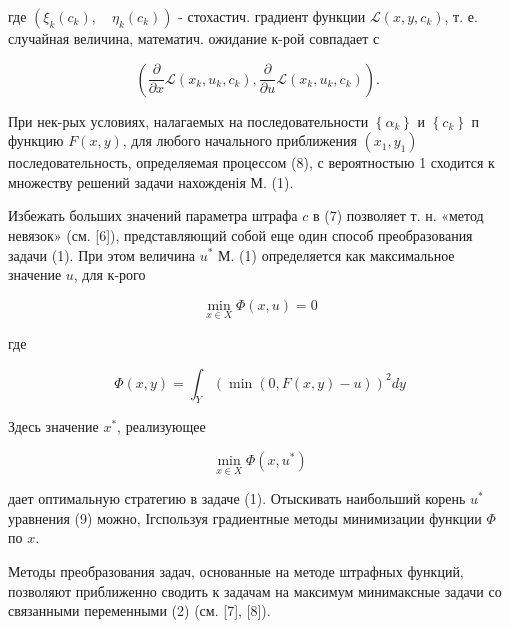 \documentclass[10pt]{article}
\begin{document}
где $\left(\xi_{k}\left(c_{k}\right), \quad \eta_{k}\left(c_{k}\right)\right)$ - стохастич. градиент функции $\mathscr{L}\left(x, y, c_{k}\right)$, т. е. случайная величина, математич. ожидание к-рой совпадает с



\[

\left(\frac{\partial}{\partial x} \mathscr{L}\left(x_{k}, u_{k}, c_{k}\right), \frac{\partial}{\partial u} \mathscr{L}\left(x_{k}, u_{k}, c_{k}\right)\right) \text {. }

\]



При нек-рых условиях, налагаемых на последовательности $\left\{\alpha_{k}\right\}$ и $\left\{c_{k}\right\}$ п функцию $F(x, y)$, для любого начального приближения $\left(x_{1}, y_{1}\right)$ последовательность, определяемая процессом (8), с вероятностыю 1 сходится к множеству решений задачи нахожденія М. (1).



Избежать больших значений параметра штрафа $c$ в (7) позволяет т. н. «метод невязок» (см. [6]), представляющий собой еще один способ преобразования задачи (1). При этом величина $u^{*}$ М. (1) определяется как максимальное значение $u$, для к-рого



\[

\min _{x \in X} \Phi(x, u)=0

\]



где



\[

\Phi(x, y)=\int_{Y}(\min (0, F(x, y)-u))^{2} d y

\]



Здесь значение $x^{*}$, реализующее



\[

\min _{x \in X} \Phi\left(x, u^{*}\right)

\]



дает оптимальную стратегию в задаче (1). Отыскивать наибольший корень $u^{*}$ уравнения (9) можно, Ігспользуя градиентные методы минимизации функции $\Phi$ по $x$.



Методы преобразования задач, основанные на методе штрафных функций, позволяют приближенно сводить к задачам на максимум минимаксные задачи со связанными переменными (2) (см. [7], [8]).
\end{document}
